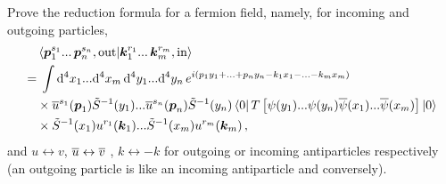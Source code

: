 \begin{ex} \label{ex_29} 
    Prove the reduction formula for a fermion field, namely, for incoming and outgoing particles,
    \begin{equation} \label{sandwich}
    \begin{split}
        & \braket{\boldsymbol{p}_1^{s_1} ...\, \boldsymbol{p}_n^{s_n}, {\rm out}}{\boldsymbol{k}_1^{r_1} ...\, \boldsymbol{k}_m^{r_m}, {\rm in}} \\
        = &\; \int {\rm d}^4x_1 ... {\rm d}^4x_m \, {\rm d}^4y_1 ... {\rm d}^4y_n \, e^{i(p_1 y_1 + ... + p_n y_n - k_1 x_1 - ... - k_m x_m)}  \\
        & \times \overline{u}^{s_1}(\boldsymbol{p}_1) \tilde{S}^{-1}(y_1) ... \overline{u}^{s_n}(\boldsymbol{p}_n) \tilde{S}^{-1}(y_n) \bra{0} T\left[\psi(y_1) ... \psi(y_n) \overline{\psi}(x_1) ... \overline{\psi}(x_m) \right]\ket{0} \\
        & \times \tilde{S}^{-1}(x_1) u^{r_1}(\boldsymbol{k}_1) ... \tilde{S}^{-1}(x_m) u^{r_m}(\boldsymbol{k}_m) \, ,
    \end{split}
    \end{equation}
    and $u \leftrightarrow v$, $\overline{u} \leftrightarrow \overline{v}$ , $k \leftrightarrow -k$ for outgoing or incoming antiparticles respectively (an outgoing particle is like an incoming antiparticle and conversely).
\end{ex}


